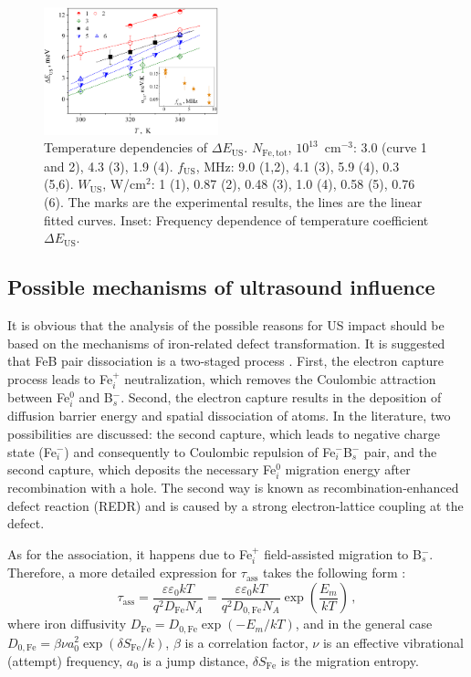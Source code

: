 \documentclass[%
 aip,jap,
 amsmath,amssymb,
 reprint,%
]{revtex4-1}
\begin{document}
\begin{figure}
\includegraphics[width=0.45\textwidth]{Fig6}%
\caption{\label{Fig:EmT}
Temperature dependencies of $\Delta E_\mathrm{US}$.
$N_\mathrm{Fe,tot}$, $10^{13}$~cm$^{-3}$:
3.0 (curve 1 and 2), 4.3 (3), 1.9 (4).
$f_\mathrm{US}$, MHz: 9.0 (1,2), 4.1 (3), 5.9 (4), 0.3 (5,6).
$W_\mathrm{US}$, W/cm$^2$: 1 (1), 0.87 (2), 0.48 (3), 1.0 (4), 0.58 (5), 0.76 (6).
The marks are the experimental results, the lines are the linear fitted curves.
Inset: Frequency dependence of temperature coefficient $\Delta E_\mathrm{US}$.
}
\end{figure}

\subsection{\label{sec:Meh} Possible mechanisms of ultrasound influence}

It is obvious that the analysis of the possible reasons for US impact should be based on the mechanisms of iron-related defect transformation.
It is suggested that FeB pair dissociation is a two-staged process \cite{FeBAssJAP2014,FeBLight2,KIMERLINGFeB}.
First, the electron capture process leads to Fe$_i^+$ neutralization, which removes the Coulombic attraction between Fe$_i^0$ and B$_s^-$.
Second, the electron capture results in the deposition of diffusion barrier energy and spatial dissociation of atoms.
In the literature, two possibilities are discussed:
the second capture, which leads to negative charge state (Fe$_i^-$) and consequently to Coulombic repulsion of Fe$_i^-$B$_s^-$ pair,
and the second capture, which deposits the necessary Fe$_i^0$ migration energy
after recombination with a hole.
The second way is known\cite{FeBAssJAP2014} as recombination-enhanced defect reaction (REDR) and is caused by a strong electron-lattice coupling at the defect.

As for the association, it happens due to Fe$_i^+$ field-assisted migration to B$_s^-$.
Therefore, a more detailed expression for $\tau_\mathrm{ass}$ takes
the following form \cite{FeBAssJAP2014,FeBJAP2005,FeBKin2019}:
\begin{equation}
\label{eqTass2}
\tau_\mathrm{ass}=\frac{\varepsilon\varepsilon_0 kT}{q^2D_\mathrm{Fe}N_A}=
\frac{\varepsilon\varepsilon_0 kT}{q^2D_\mathrm{0,Fe}N_A}\exp\left(\frac{E_m}{kT}\right)\,,
\end{equation}
where
iron diffusivity
$D_\mathrm{Fe}=D_\mathrm{0,Fe}\exp(-E_m/kT)$,
and in the general case\cite{AZIZ2001,Stavola,WeberFe}
$D_\mathrm{0,Fe}=\beta\nu a_0^2\exp(\delta S_\mathrm{Fe}/k)$,
$\beta$ is a correlation factor,
$\nu$  is an effective vibrational (attempt) frequency,
$a_0$ is a jump distance,
$\delta S_\mathrm{Fe}$ is the migration entropy.
\end{document}
